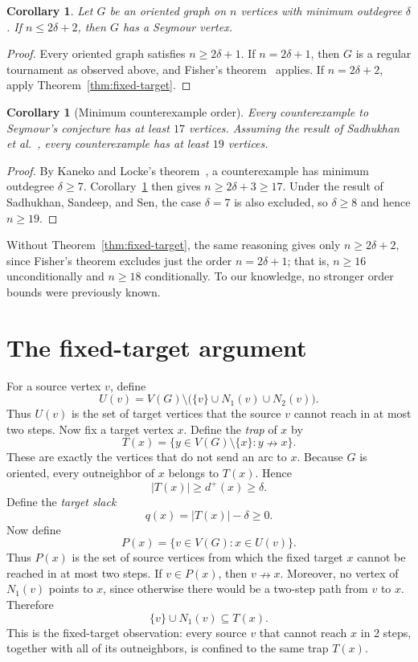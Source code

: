 \documentclass[12pt]{article}
\theoremstyle{plainsl}
\newtheorem{corollary}[theorem]{Corollary}
\theoremstyle{remark}
\begin{document}
\begin{corollary}\label{cor:dense-case}
Let $G$ be an oriented graph on $n$ vertices with minimum outdegree $\delta$.
If $n\le2\delta+2$, then $G$ has a Seymour vertex.
\end{corollary}

\begin{proof}
Every oriented graph satisfies $n\ge2\delta+1$.  If $n=2\delta+1$, then $G$
is a regular tournament as observed above, and Fisher's
theorem~\cite{Fisher1996} applies.  If $n=2\delta+2$, apply
Theorem~\ref{thm:fixed-target}.
\end{proof}

\begin{corollary}[Minimum counterexample order]\label{cor:counterexample-order}
Every counterexample to Seymour's conjecture has at least $17$ vertices.
Assuming the result of Sadhukhan et al.~\cite{SadhukhanSandeepSen2026}, every
counterexample has at least $19$ vertices.
\end{corollary}

\begin{proof}
By Kaneko and Locke's theorem~\cite{KanekoLocke2001}, a counterexample has
minimum outdegree $\delta\ge7$.  Corollary~\ref{cor:dense-case} then gives
$n\ge2\delta+3\ge17$.  Under the result of Sadhukhan, Sandeep, and Sen, the
case $\delta=7$ is also excluded, so $\delta\ge8$ and hence $n\ge19$.
\end{proof}

Without Theorem~\ref{thm:fixed-target}, the same reasoning gives only
$n\ge2\delta+2$, since Fisher's theorem excludes just the order $n=2\delta+1$;
that is, $n\ge16$ unconditionally and $n\ge18$ conditionally.  To our
knowledge, no stronger order bounds were previously known.

\section{The fixed-target argument}

For a source vertex $v$, define
\[
 U(v)=V(G)\setminus\bigl(\{v\}\cup N_1(v)\cup N_2(v)\bigr).
\]
Thus $U(v)$ is the set of target vertices that the source $v$ cannot reach in
at most two steps. Now fix a target vertex $x$.  Define the \emph{trap} of $x$ by
\[
 T(x)=\{y\in V(G)\setminus\{x\}:y\nrightarrow x\}.
\]
These are exactly the vertices that do not send an arc to $x$.  Because $G$
is oriented, every outneighbor of $x$ belongs to $T(x)$.  Hence
\[
 |T(x)|\ge d^+(x)\ge\delta.
\]
Define the \emph{target slack}
\[
 q(x)=|T(x)|-\delta\ge0.
\]
Now define
\[
 P(x)=\{v\in V(G):x\in U(v)\}.
\]
Thus $P(x)$ is the set of source vertices from which the fixed target $x$
cannot be reached in at most two steps.  If $v\in P(x)$, then $v\nrightarrow
x$.  Moreover, no vertex of $N_1(v)$ points to $x$, since otherwise there
would be a two-step path from $v$ to $x$.  Therefore
\begin{equation}\label{eq:trap}
 \{v\}\cup N_1(v)\subseteq T(x).
\end{equation}
This is the fixed-target observation: every source $v$ that cannot reach $x$ in 2 steps, together with
all of its outneighbors, is confined to the same trap $T(x)$.
\end{document}
